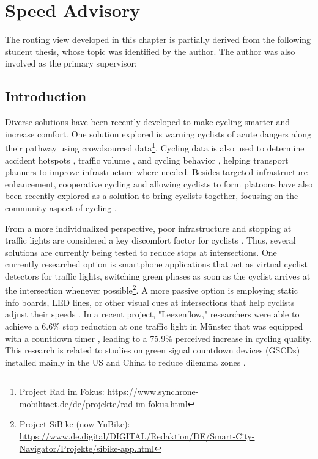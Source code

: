\chapter{Speed Advisory}\label{ch:app}

\begin{Summary}
The routing view developed in this chapter is partially derived from the following student thesis, whose topic was identified by the author. The author was also involved as the primary supervisor:

\cite{pickhardt_2022} 
\end{Summary}

\section{Introduction}

Diverse solutions have been recently developed to make cycling smarter and increase comfort. One solution explored is warning cyclists of acute dangers along their pathway using crowdsourced data\footnote{Project Rad im Fokus: \url{https://www.synchrone-mobilitaet.de/de/projekte/rad-im-fokus.html}}. Cycling data is also used to determine accident hotspots \cite{von_stulpnagel_crash_2022}, traffic volume \cite{lissner_modeling_2018}, and cycling behavior \cite{lisner_gps-data_2020}, helping transport planners to improve infrastructure where needed. Besides targeted infrastructure enhancement, cooperative cycling and allowing cyclists to form platoons have also been recently explored as a solution to bring cyclists together, focusing on the community aspect of cycling \cite{cespedes_group_2019, meng_connected_2022}.

From a more individualized perspective, poor infrastructure and stopping at traffic lights are considered a key discomfort factor for cyclists \cite{otto_framework_2023}. Thus, several solutions are currently being tested to reduce stops at intersections. One currently researched option is smartphone applications that act as virtual cyclist detectors for traffic lights, switching green phases as soon as the cyclist arrives at the intersection whenever possible\footnote{Project SiBike (now YuBike): \url{https://www.de.digital/DIGITAL/Redaktion/DE/Smart-City-Navigator/Projekte/sibike-app.html}}. A more passive option is employing static info boards, LED lines, or other visual cues at intersections that help cyclists adjust their speeds \cite{de_angelis_green_2019}. In a recent project, "Leezenflow," researchers were able to achieve a 6.6\% stop reduction at one traffic light in Münster that was equipped with a countdown timer \cite{brand_riding_2024}, leading to a 75.9\% perceived increase in cycling quality. This research is related to studies on green signal countdown devices (GSCDs) installed mainly in the US and China to reduce dilemma zones \cite{lum_before-and-after_2006, huang_evaluating_2014, ni_estimating_2014, chen_exploring_2015, islam_improved_2016}. 


